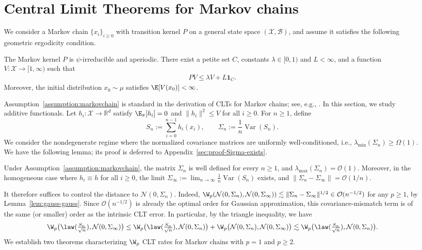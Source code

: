 \documentclass[mnsc,nonblindrev]{informs3}
\begin{document}
\section{Central Limit Theorems for Markov chains }\label{sec:MC}
We consider a Markov chain $\{x_i\}_{i\ge 0}$ with transition kernel $P$ on a general state
space $(\mathcal X,\mathcal B)$, and assume it satisfies the following geometric ergodicity
condition.
\begin{assumption}\label{assumption:markovchain}
The Markov kernel $P$ is $\psi$-irreducible and aperiodic. There exist a petite set $C$,
constants $\lambda\in[0,1)$ and $L<\infty$, and a function $V:\mathcal X\to[1,\infty)$ such
that
\begin{align*}
   PV \leq \lambda V + L\mathbf{1}_{C}. 
\end{align*}
Moreover, the initial distribution $x_0\sim\mu$ satisfies $\E[V(x_0)]<\infty$.
\end{assumption}
Assumption~\ref{assumption:markovchain} is standard in the derivation of CLTs for Markov
chains; see, e.g., \cite{Meyn12_book,douc2008bounds, srikant2024rates}. In this section, we study additive functionals.
Let $h_i:\mathcal X\to\mathbb R^{d}$ satisfy $\E_\pi[h_i]=0$ and $\|h_i\|^{2}\le V$ for all
$i\ge 0$. For $n\ge 1$, define
\[
S_n:= \sum_{i=0}^{n-1} h_i(x_i),
\qquad
\Sigma_n:= \frac{1}{n}\operatorname{Var}(S_n).
\]
We consider the nondegenerate regime where the normalized covariance matrices are uniformly well-conditioned, i.e., $\lambda_{\min}(\Sigma_n) \geq \Omega(1)$. We have the following lemma; its proof is deferred to Appendix~\ref{sec:proof-Sigma-exists}.

\begin{lemma}
\label{lem:Sigma-exists1}
Under Assumption~\ref{assumption:markovchain}, the matrix $\Sigma_n$ is well defined for
every $n\ge 1$, and $\lambda_{\max}(\Sigma_n)=\mathcal O(1)$. Moreover, in the homogeneous
case where $h_i\equiv h$ for all $i\ge 0$, the limit $  \Sigma_\infty:= \lim_{n\to\infty}\frac{1}{n}\operatorname{Var}(S_n)$ exists, and $\|\Sigma_n-\Sigma_\infty\|=\mathcal O(1/n)$.
\end{lemma}

It therefore suffices to control the distance to $\mathcal N(0,\Sigma_n)$. Indeed, $\W_p(\mathcal N(0, \Sigma_n),\mathcal N(0, \Sigma_\infty)) \lesssim \|\Sigma_n-\Sigma_\infty\|^{1/2} \in \mathcal{O} (n^{-1/2})$ for any
$p\ge 1$, by Lemma~\ref{lem:gauss-gauss}. Since $\mathcal O(n^{-1/2})$ is already the optimal order
for Gaussian approximation, this covariance-mismatch term is of the same (or smaller) order
as the intrinsic CLT error. In particular, by the triangle inequality, we have
\[
  \W_p\bigl(\law(\tfrac{S_n}{\sqrt n}),\mathcal N(0,\Sigma_\infty)\bigr)
  \le
  \W_p\bigl(\law(\tfrac{S_n}{\sqrt n}),\mathcal N(0,\Sigma_n)\bigr)
  + \W_p\bigl(\mathcal N(0,\Sigma_n),\mathcal N(0,\Sigma_\infty)\bigr)\lesssim\W_p\bigl(\law(\tfrac{S_n}{\sqrt n}),\mathcal N(0,\Sigma_n)\bigr).
\]
We establish two theorems characterizing $\W_p$ CLT rates
for Markov chains with $p=1$ and $p\geq 2$.
\end{document}
